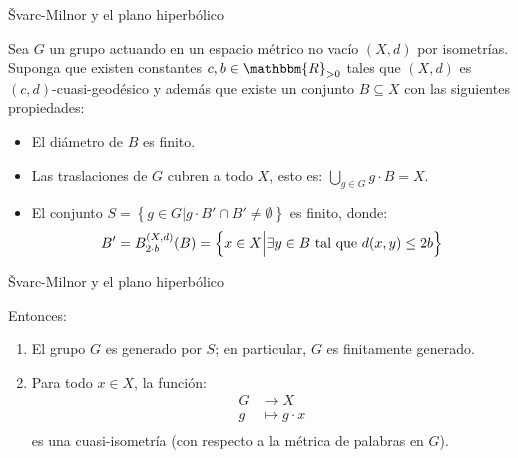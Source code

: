 \documentclass[xcolor=dvipsnames]{beamer}
\theoremstyle{largebreak}
\newcommand{\bbm}[1]{\ensuremath{\mathbbm{#1}}}
\begin{document}
\begin{frame}{Švarc-Milnor y el plano hiperbólico}
    \begin{lema}
        Sea $G$ un grupo actuando en un espacio métrico no vacío $(X,d)$ por isometrías. Suponga que existen constantes $c,b\in\bbm{R}_{>0}$ tales que $(X,d)$ es $(c,d)$-cuasi-geodésico y además que existe un conjunto $B\subseteq X$ con las siguientes propiedades:
        \begin{itemize}
            \item El diámetro de $B$ es finito.
            \item Las traslaciones de $G$ cubren a todo $X$, esto es: $\bigcup_{g\in G}g\cdot B=X$.
            \item El conjunto $S=\left\{g\in G\Big|g\cdot B'\cap B'\neq\emptyset \right\}$ es finito, donde:
            \begin{equation*}
                B'=B_{2\cdot b}^{(X,d)}(B)=\left\{x\in X\Big|\exists y\in B\textup{ tal que }d(x,y)\leq 2b \right\}
            \end{equation*}
        \end{itemize}
    \end{lema}
\end{frame}

\begin{frame}{Švarc-Milnor y el plano hiperbólico}
    \begin{lema}
        Entonces:
        \begin{enumerate}[label = \textit{(\arabic*)}]
            \item El grupo $G$ es generado por $S$; en particular, $G$ es finitamente generado.
            \item Para todo $x\in X$, la función:
            \begin{equation*}
                \begin{split}
                    G&\rightarrow X\\
                    g&\mapsto g\cdot x\\
                \end{split}
            \end{equation*}
            es una cuasi-isometría (con respecto a la métrica de palabras en $G$).
        \end{enumerate}
    \end{lema}
\end{frame}
\end{document}
